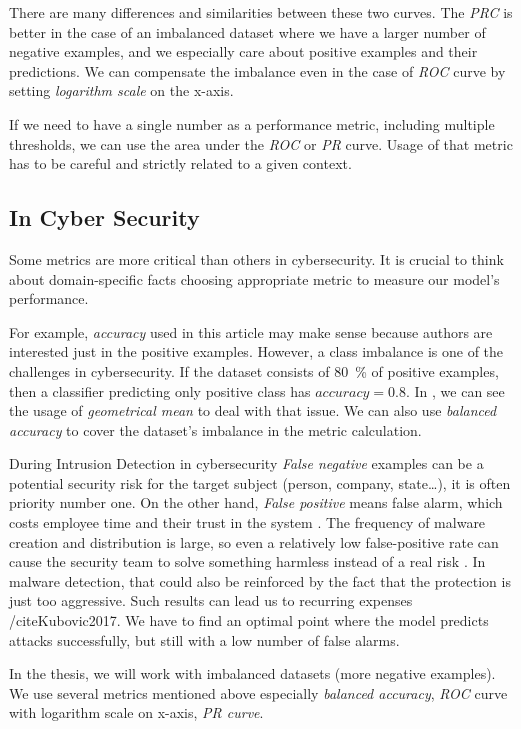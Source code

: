 There are many differences and similarities between these two curves. The \emph{PRC} is better in the case of an imbalanced dataset where we have a larger number of negative examples, and we especially care about positive examples and their predictions. We can compensate the imbalance even in the case of \emph{ROC} curve by setting \emph{logarithm scale} on the x-axis.

If we need to have a single number as a performance metric, including multiple thresholds, we can use the area under the \emph{ROC} or \emph{PR} curve. Usage of that metric has to be careful and strictly related to a given context.

\subsection{In Cyber Security}
Some metrics are more critical than others in cybersecurity. It is crucial to think about domain-specific facts choosing appropriate metric to measure our model's performance.

For example, \emph{accuracy} used in this article \cite{Ghanaei2016} may make sense because authors are interested just in the positive examples. However, a class imbalance is one of the challenges in cybersecurity. If the dataset consists of 80~\% of positive examples, then a classifier predicting only positive class has $accuracy=0.8$. In \cite{Hernandez-Callejo2019}, we can see the usage of \emph{geometrical mean} to deal with that issue. We can also use \emph{balanced accuracy} to cover the dataset's imbalance in the metric calculation.

During Intrusion Detection in cybersecurity \emph{False negative} examples can be a potential security risk for the target subject (person, company, state\dots), it is often priority number one. On the other hand,  \emph{False positive} means false alarm, which costs employee time and their trust in the system \cite{owaspintrusion}. The frequency of malware creation and distribution is large, so even a relatively low false-positive rate can cause the security team to solve something harmless instead of a real risk \cite{Apruzzese2018}. In malware detection, that could also be reinforced by the fact that the protection is just too aggressive. Such results can lead us to recurring expenses /cite{Kubovic2017}. We have to find an optimal point where the model predicts attacks successfully, but still with a low number of false alarms.

In the thesis, we will work with imbalanced datasets (more negative examples). We use several metrics mentioned above especially \emph{balanced accuracy}, \emph{ROC} curve with logarithm scale on x-axis, \emph{PR curve}.

